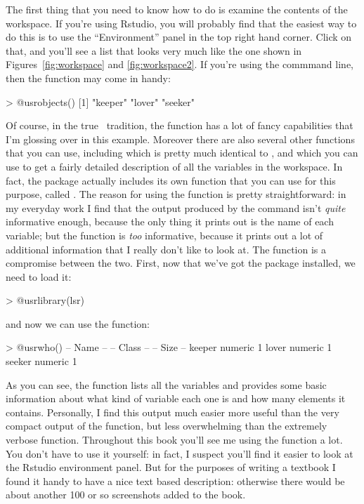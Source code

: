 The first thing that you need to know how to do is examine the contents of the workspace. If you're using Rstudio, you will probably find that the easiest way to do this is to use the ``Environment'' panel in the top right hand corner. Click on that, and you'll see a list that looks very much like the one shown in Figures~\ref{fig:workspace} and \ref{fig:workspace2}.  If you're using the commmand line, then the  function may come in handy:
\begin{rblock1}
> @usr{objects()}
[1] "keeper" "lover"  "seeker"
\end{rblock1}
Of course, in the true \R\ tradition, the  function has a lot of fancy capabilities that I'm glossing over in this example. Moreover there are also several other functions that you can use, including  which is pretty much identical to , and  which you can use to get a fairly detailed description of all the variables in the workspace. In fact, the  package actually includes its own function that you can use for this purpose, called . The reason for using the  function is pretty straightforward: in my everyday work I find that the output produced by the  command isn't {\it quite} informative enough, because the only thing it prints out is the name of each variable; but the  function is {\it too} informative, because it prints out a lot of additional information that I really don't like to look at. The  function is a compromise between the two. First, now that we've got the  package installed, we need to load it:
\begin{rblock1}
> @usr{library(lsr)}
\end{rblock1}
and now we can use the  function:
\begin{rblock1}
> @usr{who()}
   -- Name --   -- Class --   -- Size --
   keeper       numeric       1         
   lover        numeric       1         
   seeker       numeric       1         
\end{rblock1}
As you can see, the  function lists all the variables and provides some basic information about what kind of variable each one is and how many elements it contains. Personally, I find this output much easier more useful than the very compact output of the  function, but less overwhelming than the extremely verbose  function. Throughout this book you'll see me using the  function a lot. You don't have to use it yourself: in fact, I suspect you'll find it easier to look at the Rstudio environment panel. But for the purposes of writing a textbook I found it handy to have a nice text based description: otherwise there would be about another 100 or so screenshots added to the book.


